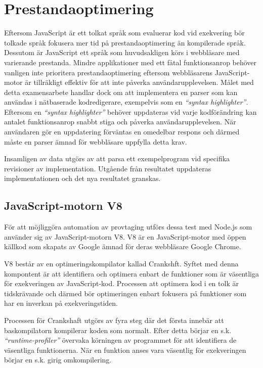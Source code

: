 \section{Prestandaoptimering}

Eftersom JavaScript är ett tolkat språk som evaluerar kod vid exekvering bör
tolkade språk fokusera mer tid på prestandaoptimering än kompilerade språk. Dessutom är
JavaScript ett språk som huvudsakligen körs i webbläsare med varierande
prestanda. Mindre applikationer med ett fåtal funktionsanrop behöver vanligen
inte prioritera prestandaoptimering eftersom webbläsarens JavaScript-motor är
tillräkligt effektiv för att inte påverka användarupplevelsen. Målet med detta
examensarbete handlar dock om att implementera en parser som kan användas i
nätbaserade kodredigerare, exempelvis som en \textit{``syntax highlighter''}.
Eftersom en \textit{``syntax highlighter''} behöver uppdateras vid varje
kodförändring kan antalet funktionsanrop snabbt stiga och påverka
användarupplevelsen. När användaren gör en uppdatering förväntas en omedelbar
respons och därmed måste en parser ämnad för webbläsare uppfylla detta krav.

Insamligen av data utgörs av att parsa ett exempelprogram vid specifika
revisioner av implementation. Utgående från resultatet uppdateras
implementationen och det nya resultatet granskas.

\subsection{JavaScript-motorn V8}

För att möjliggöra automation av provtaging utförs dessa test med Node.js
som använder sig av JavaScript-motorn V8. V8 är en JavaScript-motor med öppen
källkod som skapats av Google ämnad för deras webbläsare Google Chrome.

V8 består av en optimeringskompilator kallad Crankshft. Syftet med denna
kompontent är att identifiera och optimera enbart de funktioner som är
väsentliga för exekveringen av JavaScript-kod. Processen att optimera kod i en
tolk är tidskrävande och därmed bör optimeringen enbart fokusera på funktioner
som har en inverkan på exekveringstiden.

Processen för Crankshaft utgörs av fyra steg där det första innebär att
baskompilatorn kompilerar koden som normalt. Efter detta börjar en s.k.
\textit{``runtime-profiler''} övervaka körningen av programmet för att
identifiera de väsentliga funktionerna. När en funktion anses vara väsentlig
för exekveringen börjar en s.k. girig omkompilering.

